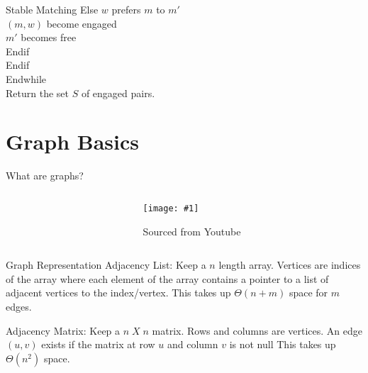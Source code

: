 \documentclass{beamer}
\newcommand{\defineFigure}[4]{
    \begin{figure}[h]
        \centering
        \texttt{[image: \#1]}
        \caption{#3}
        \label{fig:#4}
    \end{figure}
}
\begin{document}
\begin{frame}{Stable Matching}
{{                \hspace{2cm}Else $w$ prefers $m$ to $m'$\\
                \hspace{3cm}$(m, w)$ become engaged\\
                \hspace{3cm}$m'$ becomes free\\
                \hspace{2cm}Endif\\
                \hspace{1cm}Endif\\
                Endwhile\\
                Return the set $S$ of engaged pairs.
            }
        }
    \end{frame}
    \section{Graph Basics}
    \begin{frame}{What are graphs?}
        \begin{columns}
            \begin{column}{0.5\textwidth}
                \bigskip

                \bigskip

            \end{column}
            \begin{column}{0.5\textwidth}
                \defineFigure
                {Graph}{0.80}
                {Sourced from Youtube}{lookatthisgraph}
            \end{column}
        \end{columns}
    \end{frame}
    \begin{frame}{Graph Representation}
        Adjacency List: Keep a $n$ length array. Vertices are indices of the array where each element of the array 
        contains a pointer to a list of adjacent vertices to the index/vertex. 
        This takes up $\Theta(n + m)$ space for $m$ edges.
        \bigskip

        Adjacency Matrix: Keep a $n\; X\; n$ matrix. Rows and columns are vertices. 
        An edge $(u,v)$ exists if the matrix at row $u$ and column $v$ 
        is not null This takes up $\Theta(n^2)$ space.
    \end{frame}
\end{document}
